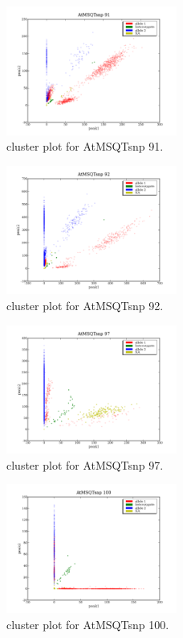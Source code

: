 \begin{figure}[H]
\includegraphics[width=0.5\textwidth]{figures/cluster_plot_AtMSQTsnp_91.png}
\caption{cluster plot for AtMSQTsnp 91.} \label{flAtMSQTsnp91}
\end{figure}

\begin{figure}[H]
\includegraphics[width=0.5\textwidth]{figures/cluster_plot_AtMSQTsnp_92.png}
\caption{cluster plot for AtMSQTsnp 92.} \label{flAtMSQTsnp92}
\end{figure}

\begin{figure}[H]
\includegraphics[width=0.5\textwidth]{figures/cluster_plot_AtMSQTsnp_97.png}
\caption{cluster plot for AtMSQTsnp 97.} \label{flAtMSQTsnp97}
\end{figure}

\begin{figure}[H]
\includegraphics[width=0.5\textwidth]{figures/cluster_plot_AtMSQTsnp_100.png}
\caption{cluster plot for AtMSQTsnp 100.} \label{flAtMSQTsnp100}
\end{figure}

